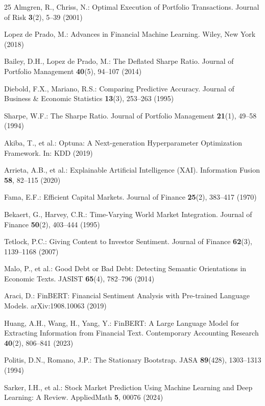 \documentclass[runningheads]{llncs}
\begin{document}
\begin{thebibliography}{25}
Almgren, R., Chriss, N.: Optimal Execution of Portfolio Transactions. Journal of Risk \textbf{3}(2), 5--39 (2001)

Lopez de Prado, M.: Advances in Financial Machine Learning. Wiley, New York (2018)

Bailey, D.H., Lopez de Prado, M.: The Deflated Sharpe Ratio. Journal of Portfolio Management \textbf{40}(5), 94--107 (2014)

Diebold, F.X., Mariano, R.S.: Comparing Predictive Accuracy. Journal of Business \& Economic Statistics \textbf{13}(3), 253--263 (1995)

Sharpe, W.F.: The Sharpe Ratio. Journal of Portfolio Management \textbf{21}(1), 49--58 (1994)

Akiba, T., et al.: Optuna: A Next-generation Hyperparameter Optimization Framework. In: KDD (2019)

Arrieta, A.B., et al.: Explainable Artificial Intelligence (XAI). Information Fusion \textbf{58}, 82--115 (2020)

Fama, E.F.: Efficient Capital Markets. Journal of Finance \textbf{25}(2), 383--417 (1970)

Bekaert, G., Harvey, C.R.: Time-Varying World Market Integration. Journal of Finance \textbf{50}(2), 403--444 (1995)

Tetlock, P.C.: Giving Content to Investor Sentiment. Journal of Finance \textbf{62}(3), 1139--1168 (2007)

Malo, P., et al.: Good Debt or Bad Debt: Detecting Semantic Orientations in Economic Texts. JASIST \textbf{65}(4), 782--796 (2014)

Araci, D.: FinBERT: Financial Sentiment Analysis with Pre-trained Language Models. arXiv:1908.10063 (2019)

Huang, A.H., Wang, H., Yang, Y.: FinBERT: A Large Language Model for Extracting Information from Financial Text. Contemporary Accounting Research \textbf{40}(2), 806--841 (2023)

Politis, D.N., Romano, J.P.: The Stationary Bootstrap. JASA \textbf{89}(428), 1303--1313 (1994)

Sarker, I.H., et al.: Stock Market Prediction Using Machine Learning and Deep Learning: A Review. AppliedMath \textbf{5}, 00076 (2024)

\end{thebibliography}
\end{document}
